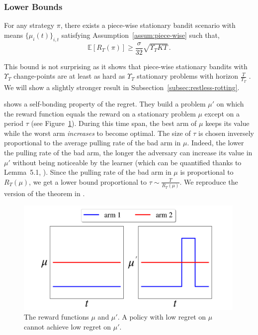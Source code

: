 \subsubsection{Lower Bounds}

\begin{proposition}
\label{prop:piecewise_lb}
For any strategy $\pi$, there exists a piece-wise stationary bandit scenario with means $\{\mu_i(t)\}_{i,t}$ satisfying Assumption~\ref{assum:piece-wise} such that,
\[
    \mathbb{E}\left[R_T(\pi)\right] \geq \frac{\sigma}{32}\sqrt{ \Upsilon_T KT}\,.
\]
\end{proposition}

This bound is not surprising as it shows that piece-wise stationary bandits with $\Upsilon_T$ change-points are at least as hard as $\Upsilon_T$ stationary problems with horizon $\frac{T}{\Upsilon_T}$ \citep{auer2002nonstochastic}. We will show a slightly stronger result in Subsection~\ref{subsec:restless-rotting}.

\citet{garivier2011upper-confidence-bound} shows a self-bonding property of the regret. They build a problem $\mu'$ on which the reward function equals the reward on a stationary problem $\mu$ except on a period $\tau$ (see Figure~\ref{fig:garivier-lb}). During this time span, the best arm of $\mu$ keeps its value while the worst arm \textit{increases} to become optimal. The size of $\tau$ is chosen inversely proportional to the average pulling rate of the bad arm in $\mu$. Indeed, the lower the pulling rate of the bad arm, the longer the adversary can increase its value in $\mu'$ without being noticeable by the learner (which can be quantified thanks to Lemma~5.1, \citet{auer2002nonstochastic}). Since the pulling rate of the bad arm in $\mu$ is proportional to $R_T(\mu)$, we get a lower bound proportional to $\tau \sim \frac{T}{R_T(\mu)}$. We reproduce the version of the theorem in \citet{lattimore2020banditbook}. 

\begin{figure}[h]
\centering
\includegraphics[clip, width= 0.99\textwidth]{4Restless/fig/garivier_lb.png}
\caption{The reward functions $\mu$ and $\mu'$. A policy with low regret on $\mu$ cannot achieve low regret on $\mu'$.}
\label{fig:garivier-lb}
\end{figure}

